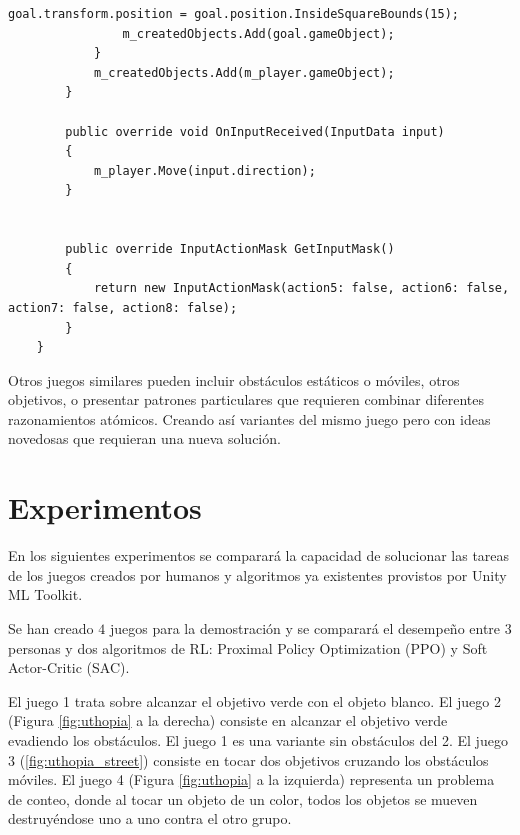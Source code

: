 \begin{lstlisting}[caption={Ejemplo de implementación del juego FindGoal, el cual trata sobre hacer que el objeto de color blanco toque al objeto verde.}]
                goal.transform.position = goal.position.InsideSquareBounds(15);
                m_createdObjects.Add(goal.gameObject);
            }
            m_createdObjects.Add(m_player.gameObject);
        }
 
        public override void OnInputReceived(InputData input)
        {
            m_player.Move(input.direction);
        }
 
        
        public override InputActionMask GetInputMask()
        {
            return new InputActionMask(action5: false, action6: false, action7: false, action8: false);
        }
    }
\end{lstlisting}
 
Otros juegos similares pueden incluir obstáculos estáticos o móviles, otros objetivos, o presentar patrones particulares que requieren combinar diferentes razonamientos atómicos. Creando así variantes del mismo juego pero con ideas novedosas que requieran una nueva solución.

\section{Experimentos}
 
En los siguientes experimentos se comparará la capacidad de solucionar las tareas de los juegos creados por humanos y algoritmos ya existentes provistos por Unity ML Toolkit. 
 
Se han creado $4$ juegos para la demostración y se comparará el desempeño entre $3$ personas y dos algoritmos de RL: Proximal Policy Optimization (PPO) y Soft Actor-Critic (SAC).
 
El juego 1 trata sobre alcanzar el objetivo verde con el objeto blanco. El juego 2 (Figura \ref{fig:uthopia} a la derecha) consiste en alcanzar el objetivo verde evadiendo los obstáculos. El juego 1 es una variante sin obstáculos del 2. El juego 3 (\ref{fig:uthopia_street}) consiste en tocar dos objetivos cruzando los obstáculos móviles. El juego 4 (Figura \ref{fig:uthopia} a la izquierda) representa un problema de conteo, donde al tocar un objeto de un color, todos los objetos se mueven destruyéndose uno a uno contra el otro grupo.
 
\vspace*{1cm}
 
